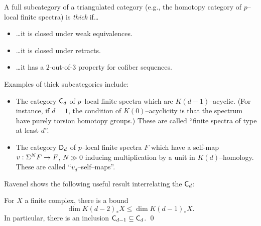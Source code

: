 \begin{definition}
A full subcategory of a triangulated category (e.g., the homotopy category of $p$--local finite spectra) is \textit{thick} if\ldots{}
\begin{itemize}
\item \ldots it is closed under weak equivalences.
\item \ldots it is closed under retracts.
\item \ldots it has a $2$-out-of-$3$ property for cofiber sequences.
\end{itemize}
\end{definition}

\noindent Examples of thick subcategories include:
\begin{itemize}
\item The category $\mathsf{C}_d$ of $p$--local finite spectra which are $K(d-1)$--acyclic.  (For instance, if $d = 1$, the condition of $K(0)$--acyclicity is that the spectrum have purely torsion homotopy groups.)  These are called ``finite spectra of type at least $d$''.
\item The category $\mathsf{D}_d$ of $p$--local finite spectra $F$ which have a self-map $v: \Sigma^N F \to F$, $N \gg 0$ inducing multiplication by a unit in $K(d)$--homology.  These are called ``$v_d$--self--maps''.
\end{itemize}

Ravenel shows the following useful result interrelating the $\mathsf{C}_d$:
\begin{lemma}\label{CdCategoriesNest}
For $X$ a finite complex, there is a bound \[\dim K(d-2)_* X \le \dim K(d-1)_* X.\]  In particular, there is an inclusion $\mathsf{C}_{d-1} \subseteq \mathsf{C}_d$. \qed
\end{lemma}

